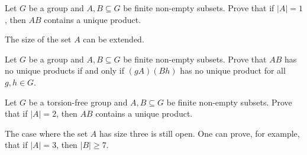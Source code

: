 \begin{exercise}
\label{xca:A1Bm}
    Let $G$ be a group and $A,B\subseteq G$ be finite non-empty subsets. Prove that 
    if $|A|=1$, then $AB$ contains a unique product. 
\end{exercise}




The size of the set $A$ can be extended. 

\begin{exercise}
\label{xca:gABh}
    Let $G$ be a group and $A,B\subseteq G$ be finite non-empty subsets. Prove that
    $AB$ has no unique products 
    if and only if $(gA)(Bh)$ has no unique product for all $g,h\in G$. 
\end{exercise}


\begin{exercise}
\label{xca:A2Bm}
    Let $G$ be a torsion-free group and $A,B\subseteq G$ be finite non-empty subsets. Prove that 
    if $|A|=2$, then $AB$ contains a unique product. 
\end{exercise}

The case where the set $A$ has size three is still open. One can prove, for example, 
that if $|A|=3$, then $|B|\geq7$. 





